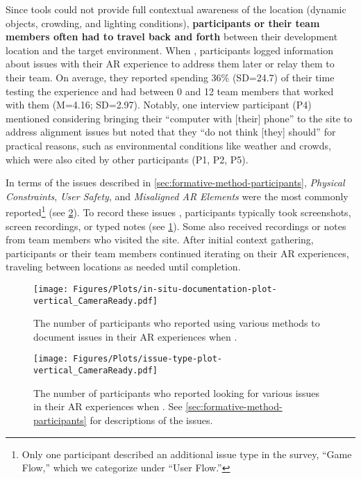 Since \exsitu tools could not provide full contextual awareness of the location (\eg dynamic objects, crowding, and lighting conditions), \textbf{participants or their team members often had to travel back and forth} between their \exsitu development location and the target environment. When \insitu[ ], participants logged information about issues with their AR experience to address them later or relay them to their team. On average, they reported spending 36\% (SD=24.7) of their time testing the experience \insitu[ ] and had between 0 and 12 team members that worked with them (M=4.16; SD=2.97). Notably, one interview participant (P4) mentioned considering bringing their ``computer with [their] phone'' to the site to address alignment issues \insitu[ ] but noted that they ``do not think [they] should'' for practical reasons, such as environmental conditions like weather and crowds, which were also cited by other participants (P1, P2, P5).

In terms of the issues described in \cref{sec:formative-method-participants}, \textit{Physical Constraints}, \textit{User Safety}, and \textit{Misaligned AR Elements} were the most commonly reported\footnote{Only one participant described an additional issue type in the survey, ``Game Flow,'' which we categorize under ``User Flow.''} (see \cref{fig:formative-issues}). To record these issues \insitu[ ], participants typically took screenshots, screen recordings, or typed notes (see \cref{fig:formative-documentation}). Some also received recordings or notes from team members who visited the site. After initial context gathering, participants or their team members continued iterating on their AR experiences, traveling between locations as needed until completion.

\begin{figure}
    \centering
    \texttt{[image: Figures/Plots/in-situ-documentation-plot-vertical\_CameraReady.pdf]}
    \caption{The number of participants who reported using various methods to document issues in their AR experiences when \insitu[ ].}
    \label{fig:formative-documentation}
\end{figure}

\begin{figure}
    \centering
    \texttt{[image: Figures/Plots/issue-type-plot-vertical\_CameraReady.pdf]}
    \caption{The number of participants who reported looking for various issues in their AR experiences when \insitu[ ]. See \cref{sec:formative-method-participants} for descriptions of the issues.}
    \label{fig:formative-issues}
\end{figure}

